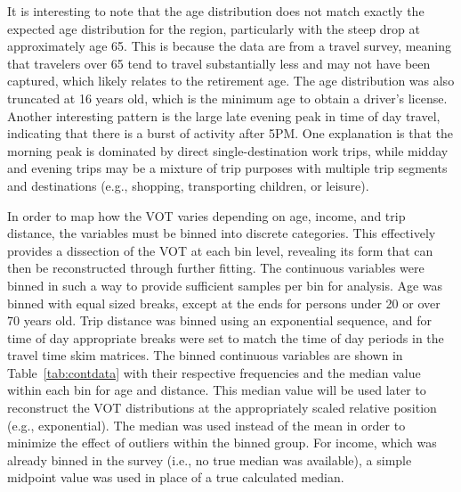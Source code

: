 \documentclass[numbered]{trbunofficial}\usepackage[]{graphicx}\usepackage[]{color}
\begin{document}
It is interesting to note that the age distribution does not match exactly the expected age distribution for the region, particularly with the steep drop at approximately age 65. This is because the data are from a travel survey, meaning that travelers over 65 tend to travel substantially less and may not have been captured, which likely relates to the retirement age. The age distribution was also truncated at 16 years old, which is the minimum age to obtain a driver's license. Another interesting pattern is the large late evening peak in time of day travel, indicating that there is a burst of activity after 5PM. One explanation is that the morning peak is dominated by direct single-destination work trips, while midday and evening trips may be a mixture of trip purposes with multiple trip segments and destinations (e.g., shopping, transporting children, or leisure). 

In order to map how the VOT varies depending on age, income, and trip distance, the variables must be binned into discrete categories. This effectively provides a dissection of the VOT at each bin level, revealing its form that can then be reconstructed through further fitting. The continuous variables were binned in such a way to provide sufficient samples per bin for analysis. Age was binned with equal sized breaks, except at the ends for persons under 20 or over 70 years old. Trip distance was binned using an exponential sequence, and for time of day appropriate breaks were set to match the time of day periods in the travel time skim matrices. The binned continuous variables are shown in Table~\ref{tab:contdata} with their respective frequencies and the median value within each bin for age and distance. This median value will be used later to reconstruct the VOT distributions at the appropriately scaled relative position (e.g., exponential). The median was used instead of the mean in order to minimize the effect of outliers within the binned group. For income, which was already binned in the survey (i.e., no true median was available), a simple midpoint value was used in place of a true calculated median.
\end{document}
